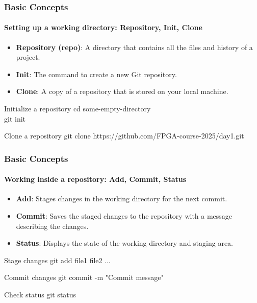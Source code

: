 \documentclass{beamer}
\begin{document}
\begin{frame}\frametitle{Basic Concepts}\framesubtitle{Setting up a working directory: Repository, Init, Clone}
\begin{itemize}
	\item \textbf{Repository (repo)}: A directory that contains all the files and history of a project.
	\vspace{0.2cm}
	\item \textbf{Init}: The command to create a new Git repository.
	\vspace{0.2cm}
	\item \textbf{Clone}: A copy of a repository that is stored on your local machine.
\end{itemize}

\begin{alertblock}{Initialize a repository}
cd some-empty-directory \\
git init
\end{alertblock}

\vspace{0.5cm}

\begin{alertblock}{Clone a repository}
git clone https://github.com/FPGA-course-2025/day1.git
\end{alertblock}

\end{frame}

\begin{frame}\frametitle{Basic Concepts}\framesubtitle{Working inside a repository: Add, Commit, Status}
\begin{itemize}
	\item \textbf{Add}: Stages changes in the working directory for the next commit.
	\vspace{0.2cm}
	\item \textbf{Commit}: Saves the staged changes to the repository with a message describing the changes.
	\vspace{0.2cm}
	\item \textbf{Status}: Displays the state of the working directory and staging area.
\end{itemize}

\begin{alertblock}{Stage changes}
git add file1 file2 ...
\end{alertblock}

\begin{alertblock}{Commit changes}
git commit -m "Commit message"
\end{alertblock}

\begin{alertblock}{Check status}
git status
\end{alertblock}

\end{frame}
\end{document}
